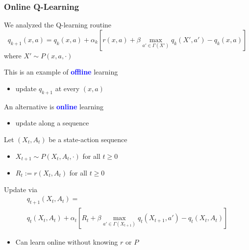\documentclass[xcolor=dvipsnames]{beamer}  %
\renewcommand{\geq}{\geqslant}
\newcommand{\navy}[1]{\textcolor{blue}{\bf #1}}
\newcommand{\1}{\mathbbm 1}
\begin{document}
\begin{frame}
    \frametitle{Online Q-Learning} 

    We analyzed the Q-learning routine
    \begin{equation*}
        q_{k+1}(x,a) 
        = q_k(x,a) + \alpha_k 
        \left[
            r(x,a) + \beta \max_{a' \in \Gamma(X')} q_k(X', a')
            - q_k(x,a)
        \right]
    \end{equation*}
    where $X' \sim P(x, a, \cdot)$

    This is an example of \navy{offline} learning

    \begin{itemize}
        \item update $q_{k+1}$ at every $(x,a)$
    \end{itemize}

    An alternative is \navy{online} learning

    \begin{itemize}
        \item update along a sequence
    \end{itemize}

\end{frame}

\begin{frame}
    
    Let $(X_t, A_t)$ be a state-action sequence

    \begin{itemize}
        \item $X_{t+1} \sim P(X_t, A_t, \cdot)$ for all $t \geq 0$
        \vspace{0.5em}
        \item $R_t := r(X_t, A_t)$ for all $t \geq 0$
    \end{itemize}

    \vspace{0.5em}
    \vspace{0.5em}

    Update via
    \begin{multline*}
        q_{t+1}(X_t, A_t) =
        \\
        q_t(X_t, A_t) + \alpha_t 
        \left[
            R_t + \beta \max_{a' \in \Gamma(X_{t+1})} q_t(X_{t+1}, a')
            - q_t(X_t, A_t)
        \right]
    \end{multline*}

    \begin{itemize}
        \item Can learn online without knowing $r$ or $P$
    \end{itemize}

\end{frame}
\end{document}
